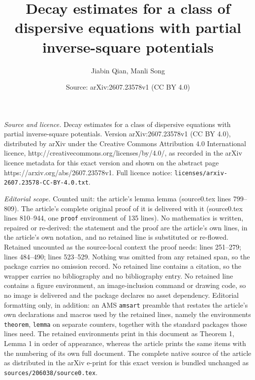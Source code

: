 \documentclass[10pt,a4paper]{amsart}
\title{Decay estimates for a class of dispersive equations with partial inverse-square potentials}
\author{Jiabin Qian, Manli Song}
\date{Source: arXiv:2607.23578v1 (CC BY 4.0)}
\begin{document}
\maketitle

\noindent\emph{Source and licence.} Decay estimates for a class of dispersive equations with partial inverse-square potentials. Version arXiv:2607.23578v1 (CC BY 4.0), distributed by arXiv under the Creative Commons Attribution 4.0 International licence, http://creativecommons.org/licenses/by/4.0/, as recorded in the arXiv licence metadata for this exact version and shown on the abstract page https://arxiv.org/abs/2607.23578v1. Full licence notice: \texttt{licenses/arxiv-2607.23578-CC-BY-4.0.txt}.\par\smallskip

\noindent\textit{Editorial scope.} Counted unit: the article's lemma lemma (source0.tex lines 799--809). The article's complete original proof of it is delivered with it (source0.tex lines 810--944, one \texttt{proof} environment of 135 lines). No mathematics is written, repaired or re-derived: the statement and the proof are the article's own lines, in the article's own notation, and no retained line is substituted or re-flowed.  Retained uncounted as the source-local context the proof needs: lines 251--279; lines 484--490; lines 523--529.  Nothing was omitted from any retained span, so the package carries no omission record.  No retained line contains a citation, so the wrapper carries no bibliography and no bibliography entry.  No retained line contains a figure environment, an image-inclusion command or drawing code, so no image is delivered and the package declares no asset dependency.  Editorial formatting only, in addition: an AMS \texttt{amsart} preamble that restates the article's own declarations and macros used by the retained lines, namely the environments \texttt{theorem}, \texttt{lemma} on separate counters, together with the standard packages those lines need.  The retained environments print in this document as Theorem 1, Lemma 1 in order of appearance, whereas the article prints the same items with the numbering of its own full document.  The complete native source of the article as distributed in the arXiv e-print for this exact version is bundled unchanged as \texttt{sources/206038/source0.tex}.
\end{document}
